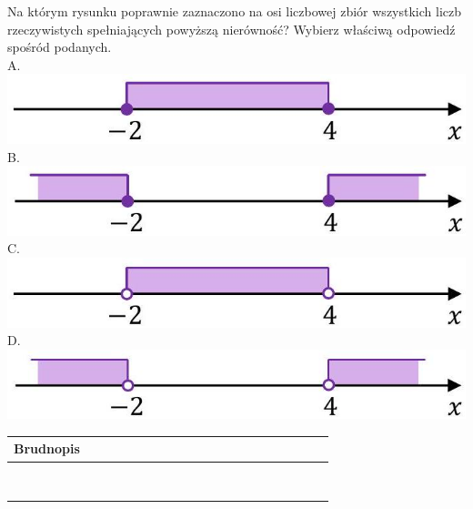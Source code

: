 \documentclass[10pt]{article}
\begin{document}
Na którym rysunku poprawnie zaznaczono na osi liczbowej zbiór wszystkich liczb rzeczywistych spełniających powyższą nierówność? Wybierz właściwą odpowiedź spośród podanych.\\
A.\\
\includegraphics[max width=\textwidth, center]{2024_11_21_daeb5e5efb43dd4cb535g-04(2)}\\
B.\\
\includegraphics[max width=\textwidth, center]{2024_11_21_daeb5e5efb43dd4cb535g-04}\\
C.\\
\includegraphics[max width=\textwidth, center]{2024_11_21_daeb5e5efb43dd4cb535g-04(1)}\\
D.\\
\includegraphics[max width=\textwidth, center]{2024_11_21_daeb5e5efb43dd4cb535g-04(3)}

\begin{center}
\begin{tabular}{|c|c|c|c|c|c|c|c|c|c|c|c|c|c|c|c|c|c|c|c|c|c|c|}
\hline
\multicolumn{4}{|l|}{Brudnopis} &  &  &  &  &  &  &  &  &  &  &  &  &  &  &  &  &  &  &  \\
\hline
 &  &  &  &  &  &  &  &  &  &  &  &  &  &  &  &  &  &  &  &  &  &  \\
\hline
 &  &  &  &  &  &  &  &  &  &  &  &  &  &  &  &  &  &  &  &  &  &  \\
\hline
 &  &  &  &  &  &  &  &  &  &  &  &  &  &  &  &  &  &  &  &  &  &  \\
\hline
 &  &  &  &  &  &  &  &  &  &  &  &  &  &  &  &  &  &  &  &  &  &  \\
\hline
 &  &  &  &  &  &  &  &  &  &  &  &  &  &  &  &  &  &  &  &  &  &  \\
\hline
 &  &  &  &  &  &  &  &  &  &  &  &  &  &  &  &  &  &  &  &  &  &  \\
\hline
 &  &  &  &  &  &  &  &  &  &  &  &  &  &  &  &  &  &  &  &  &  &  \\
\hline
 &  &  &  &  &  &  &  &  &  &  &  &  &  &  &  &  &  &  &  &  &  &  \\
\hline
\end{tabular}
\end{center}
\end{document}
